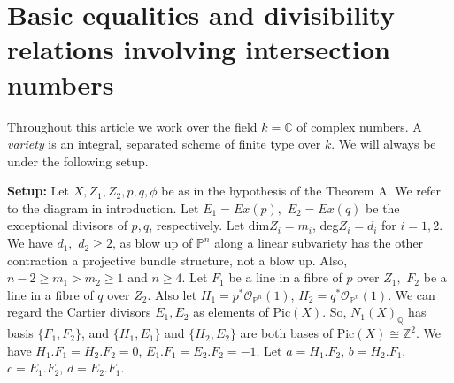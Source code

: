 \documentclass{article}
\begin{document}
\section{Basic equalities and divisibility relations involving intersection numbers}
Throughout this article we work over the field $k=\mathbb{C}$ of complex numbers. A \textit{variety} is an integral, separated scheme of finite type over $k$. We will always be under the following setup.

\textbf{Setup:} Let $X, Z_1, Z_2, p, q, \phi$ be as in the hypothesis of the Theorem A. We refer to the diagram in introduction. Let $E_1=Ex(p),$ $E_2=Ex(q)$ be the exceptional divisors of $p,q$, respectively. Let dim$Z_i=m_i$, deg$Z_i=d_i$ for $i=1,2$. We have $d_1,$ $d_2\geq2$, as blow up of $\mathbb{P}^n$ along a linear subvariety has the other contraction a projective bundle structure, not a blow up. Also, $n-2\geq m_1>m_2\geq 1$ and $n\geq 4$.  Let $F_1$ be a line in a fibre of $p$ over $Z_1,$ $F_2$ be a line in a fibre of $q$ over $Z_2.$ Also let $H_1=p^*\mathcal{O}_{\mathbb{P}^n}(1)$, $H_2=q^*\mathcal{O}_{\mathbb{P}^n}(1)$. We can regard the Cartier divisors $E_1, E_2$ as elements of Pic$(X)$. So, $N_1(X)_{\mathbb{Q}}$ has basis $\{F_1, F_2\}$, and $\{H_1, E_1\}$ and $\{H_2, E_2\}$ are both bases of Pic$(X)\cong \mathbb{Z}^2$. We have $H_1.F_1=H_2.F_2=0$, $E_1.F_1=E_2.F_2=-1$. Let $a=H_1.F_2$, $b=H_2.F_1$, $c=E_1.F_2$, $d=E_2.F_1$.
\end{document}

